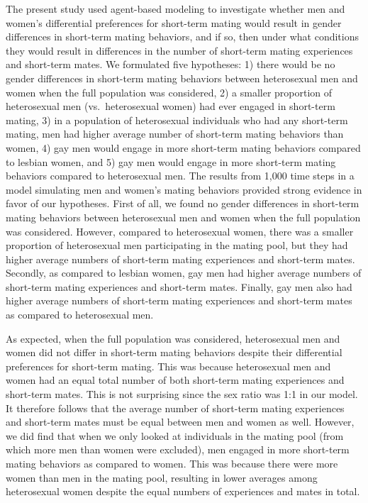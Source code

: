 \documentclass[
  11pt,
]{article}
\begin{document}
The present study used agent-based modeling to investigate whether men
and women's differential preferences for short-term mating would result
in gender differences in short-term mating behaviors, and if so, then
under what conditions they would result in differences in the number of
short-term mating experiences and short-term mates. We formulated five
hypotheses: 1) there would be no gender differences in short-term mating
behaviors between heterosexual men and women when the full population
was considered, 2) a smaller proportion of heterosexual men
(vs.~heterosexual women) had ever engaged in short-term mating, 3) in a
population of heterosexual individuals who had any short-term mating,
men had higher average number of short-term mating behaviors than women,
4) gay men would engage in more short-term mating behaviors compared to
lesbian women, and 5) gay men would engage in more short-term mating
behaviors compared to heterosexual men. The results from 1,000 time
steps in a model simulating men and women's mating behaviors provided
strong evidence in favor of our hypotheses. First of all, we found no
gender differences in short-term mating behaviors between heterosexual
men and women when the full population was considered. However, compared
to heterosexual women, there was a smaller proportion of heterosexual
men participating in the mating pool, but they had higher average
numbers of short-term mating experiences and short-term mates. Secondly,
as compared to lesbian women, gay men had higher average numbers of
short-term mating experiences and short-term mates. Finally, gay men
also had higher average numbers of short-term mating experiences and
short-term mates as compared to heterosexual men.

As expected, when the full population was considered, heterosexual men
and women did not differ in short-term mating behaviors despite their
differential preferences for short-term mating. This was because
heterosexual men and women had an equal total number of both short-term
mating experiences and short-term mates. This is not surprising since
the sex ratio was 1:1 in our model. It therefore follows that the
average number of short-term mating experiences and short-term mates
must be equal between men and women as well. However, we did find that
when we only looked at individuals in the mating pool (from which more
men than women were excluded), men engaged in more short-term mating
behaviors as compared to women. This was because there were more women
than men in the mating pool, resulting in lower averages among
heterosexual women despite the equal numbers of experiences and mates in
total.
\end{document}

